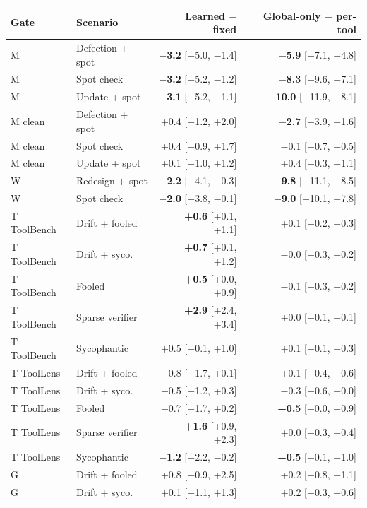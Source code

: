\begin{table}[H]
\centering
\small
\begin{tabular}{llrr}
\toprule
Gate & Scenario & Learned $-$ fixed & Global-only $-$ per-tool \\
\midrule
M & Defection + spot & \textbf{$-$3.2} [$-$5.0, $-$1.4] & \textbf{$-$5.9} [$-$7.1, $-$4.8] \\
M & Spot check & \textbf{$-$3.2} [$-$5.2, $-$1.2] & \textbf{$-$8.3} [$-$9.6, $-$7.1] \\
M & Update + spot & \textbf{$-$3.1} [$-$5.2, $-$1.1] & \textbf{$-$10.0} [$-$11.9, $-$8.1] \\
M clean & Defection + spot & +0.4 [$-$1.2, +2.0] & \textbf{$-$2.7} [$-$3.9, $-$1.6] \\
M clean & Spot check & +0.4 [$-$0.9, +1.7] & $-$0.1 [$-$0.7, +0.5] \\
M clean & Update + spot & +0.1 [$-$1.0, +1.2] & +0.4 [$-$0.3, +1.1] \\
W & Redesign + spot & \textbf{$-$2.2} [$-$4.1, $-$0.3] & \textbf{$-$9.8} [$-$11.1, $-$8.5] \\
W & Spot check & \textbf{$-$2.0} [$-$3.8, $-$0.1] & \textbf{$-$9.0} [$-$10.1, $-$7.8] \\
T ToolBench & Drift + fooled & \textbf{+0.6} [+0.1, +1.1] & +0.1 [$-$0.2, +0.3] \\
T ToolBench & Drift + syco. & \textbf{+0.7} [+0.1, +1.2] & $-$0.0 [$-$0.3, +0.2] \\
T ToolBench & Fooled & \textbf{+0.5} [+0.0, +0.9] & $-$0.1 [$-$0.3, +0.2] \\
T ToolBench & Sparse verifier & \textbf{+2.9} [+2.4, +3.4] & +0.0 [$-$0.1, +0.1] \\
T ToolBench & Sycophantic & +0.5 [$-$0.1, +1.0] & +0.1 [$-$0.1, +0.3] \\
T ToolLens & Drift + fooled & $-$0.8 [$-$1.7, +0.1] & +0.1 [$-$0.4, +0.6] \\
T ToolLens & Drift + syco. & $-$0.5 [$-$1.2, +0.3] & $-$0.3 [$-$0.6, +0.0] \\
T ToolLens & Fooled & $-$0.7 [$-$1.7, +0.2] & \textbf{+0.5} [+0.0, +0.9] \\
T ToolLens & Sparse verifier & \textbf{+1.6} [+0.9, +2.3] & +0.0 [$-$0.3, +0.4] \\
T ToolLens & Sycophantic & \textbf{$-$1.2} [$-$2.2, $-$0.2] & \textbf{+0.5} [+0.1, +1.0] \\
G & Drift + fooled & +0.8 [$-$0.9, +2.5] & +0.2 [$-$0.8, +1.1] \\
G & Drift + syco. & +0.1 [$-$1.1, +1.3] & +0.2 [$-$0.3, +0.6] \\

\end{tabular}
\end{table}
